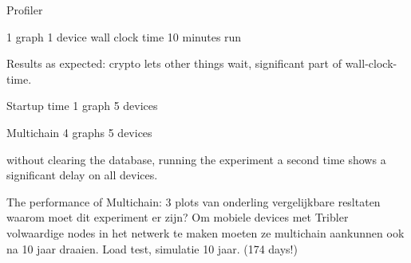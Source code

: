Profiler

1 graph
1 device
wall clock time
10 minutes run

Results as expected: crypto lets other things wait, significant part of wall-clock-time.



Startup time
1 graph
5 devices


Multichain
4 graphs
5 devices

without clearing the database, running the experiment a second time shows a significant delay on all devices.

The performance of Multichain:
3 plots van onderling vergelijkbare resltaten
waarom moet dit experiment er zijn?
Om mobiele devices met Tribler volwaardige nodes in het netwerk te maken moeten ze multichain aankunnen ook na 10 jaar draaien.
Load test, simulatie 10 jaar. (174 days!)
